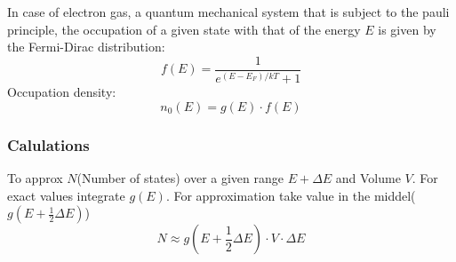 In case of electron gas, a quantum mechanical system that is subject to the pauli principle, the occupation of a given state with that of the energy \(E\) is given by the Fermi-Dirac distribution:
\[
f(E) = \frac{1}{e^{(E-E_F)/kT} + 1}
\]
Occupation density:
\[
n_0(E) = g(E)\cdot f(E)
\]
\subsubsection{Calulations}
To approx \(N\)(Number of states) over a given range \(E + \Delta E\) and Volume \(V\). For exact values integrate \(g(E)\). For approximation take value in the middel(\(g(E + \frac{1}{2}\Delta E)\))
\begin{equation*}
    N \approx g(E + \frac{1}{2}\Delta E) \cdot V \cdot \Delta E
\end{equation*}